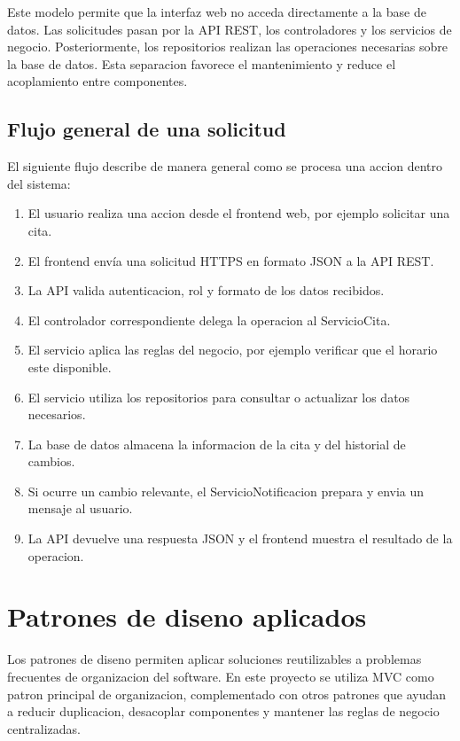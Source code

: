 \documentclass[12pt,letterpaper]{article}
\begin{document}
Este modelo permite que la interfaz web no acceda directamente a la base de datos. Las solicitudes pasan por la API REST, los controladores y los servicios de negocio. Posteriormente, los repositorios realizan las operaciones necesarias sobre la base de datos. Esta separacion favorece el mantenimiento y reduce el acoplamiento entre componentes.

\subsection{Flujo general de una solicitud}

El siguiente flujo describe de manera general como se procesa una accion dentro del sistema:

\begin{enumerate}[leftmargin=1.2cm]
    \item El usuario realiza una accion desde el frontend web, por ejemplo solicitar una cita.
    \item El frontend envía una solicitud HTTPS en formato JSON a la API REST.
    \item La API valida autenticacion, rol y formato de los datos recibidos.
    \item El controlador correspondiente delega la operacion al ServicioCita.
    \item El servicio aplica las reglas del negocio, por ejemplo verificar que el horario este disponible.
    \item El servicio utiliza los repositorios para consultar o actualizar los datos necesarios.
    \item La base de datos almacena la informacion de la cita y del historial de cambios.
    \item Si ocurre un cambio relevante, el ServicioNotificacion prepara y envia un mensaje al usuario.
    \item La API devuelve una respuesta JSON y el frontend muestra el resultado de la operacion.
\end{enumerate}

\section{Patrones de diseno aplicados}

Los patrones de diseno permiten aplicar soluciones reutilizables a problemas frecuentes de organizacion del software. En este proyecto se utiliza MVC como patron principal de organizacion, complementado con otros patrones que ayudan a reducir duplicacion, desacoplar componentes y mantener las reglas de negocio centralizadas.
\end{document}
